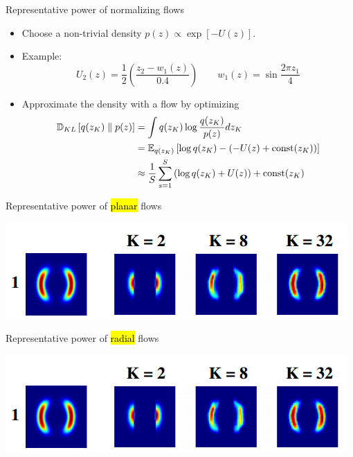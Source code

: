 \documentclass[unicode,11pt]{beamer}
\begin{document}
\begin{frame}{Representative power of normalizing flows}
  \begin{itemize}
  \item Choose a non-trivial density $p(z) \propto \exp[-U(z)]$.
  \item Example:
    $$
    U_2(z) = \frac{1}{2} \left( \frac{z_2 - w_1(z)}{0.4} \right)
    \qquad
    w_1(z) = \sin \frac{2 \pi z_1}{4}
    $$
  \item Approximate the density with a flow by optimizing
    \begin{align*}
      \KL{q(z_K)}{p(z)}
      &= \int q(z_K) \log \frac{q(z_K)}{p(z)} dz_K \\
      &= \E{q(z_K)}{\log q(z_K) - (-U(z) + \op{const}(z_K))} \\
      &\approx \frac{1}{S} \sum\limits_{s = 1}^S \left( \log q(z_K) + U(z) \right) + \op{const}(z_K)
    \end{align*}
  \end{itemize}
\end{frame}


\begin{frame}[fragile]{Representative power of \hl{planar} flows}
  \begin{center}
    \includegraphics[width=.8\textwidth]{images/normalizing_flow}
  \end{center}
\end{frame}


\begin{frame}[fragile]{Representative power of \hl{radial} flows}
  \begin{center}
    \includegraphics[width=.8\textwidth]{images/normalizing_flow}
  \end{center}
\end{frame}
\end{document}
